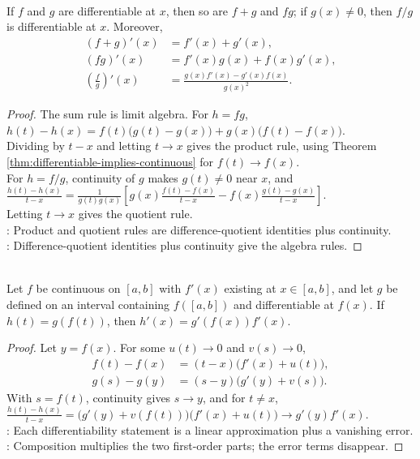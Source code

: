 \begin{theorem} \label{thm:derivative-algebra-rules} \\
If $f$ and $g$ are differentiable at $x$, then so are $f+g$ and $fg$; if $g(x)\neq0$, then $f/g$ is differentiable at $x$. Moreover,
\begin{align}
(f+g)'(x)&=f'(x)+g'(x), \nonumber\\
(fg)'(x)&=f'(x)g(x)+f(x)g'(x), \nonumber\\
\left(\frac{f}{g}\right)'(x)&=\frac{g(x)f'(x)-g'(x)f(x)}{g(x)^2}. \nonumber
\end{align}
\begin{proof}
The sum rule is limit algebra. For $h=fg$, $h(t)-h(x)=f(t)\bigl(g(t)-g(x)\bigr)+g(x)\bigl(f(t)-f(x)\bigr)$.\\
Dividing by $t-x$ and letting $t\to x$ gives the product rule, using Theorem \ref{thm:differentiable-implies-continuous} for $f(t)\to f(x)$.\\
For $h=f/g$, continuity of $g$ makes $g(t)\neq0$ near $x$, and $\frac{h(t)-h(x)}{t-x} =\frac{1}{g(t)g(x)} \left[ g(x)\frac{f(t)-f(x)}{t-x} -f(x)\frac{g(t)-g(x)}{t-x} \right]$.\\
Letting $t\to x$ gives the quotient rule.\\
: Product and quotient rules are difference-quotient identities plus continuity.\\
: Difference-quotient identities plus continuity give the algebra rules.
\end{proof}
\end{theorem}

\begin{theorem} \label{thm:chain-rule-one-variable} \\
Let $f$ be continuous on $[a,b]$ with $f'(x)$ existing at $x\in[a,b]$, and let $g$ be defined on an interval containing $f([a,b])$ and differentiable at $f(x)$. If $h(t)=g(f(t))$, then $h'(x)=g'(f(x))f'(x)$.
\begin{proof}
Let $y=f(x)$. For some $u(t)\to0$ and $v(s)\to0$,
\begin{align}
f(t)-f(x)&=(t-x)\bigl(f'(x)+u(t)\bigr), \nonumber\\
g(s)-g(y)&=(s-y)\bigl(g'(y)+v(s)\bigr). \nonumber
\end{align}
With $s=f(t)$, continuity gives $s\to y$, and for $t\neq x$, $\frac{h(t)-h(x)}{t-x} =\bigl(g'(y)+v(f(t))\bigr)\bigl(f'(x)+u(t)\bigr)\to g'(y)f'(x)$.\\
: Each differentiability statement is a linear approximation plus a vanishing error.\\
: Composition multiplies the two first-order parts; the error terms disappear.
\end{proof}
\end{theorem}

